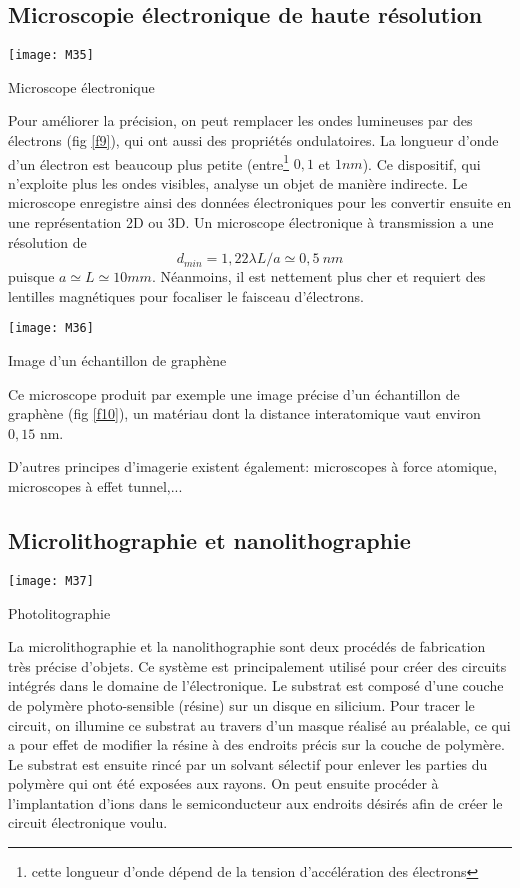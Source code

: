 \subsection{Microscopie électronique de haute résolution}

\begin{marginfigure}[-1cm]
\texttt{[image: M35]}
\caption{Microscope électronique}
\label{f9}
\end{marginfigure}

Pour améliorer la précision, on peut remplacer les ondes lumineuses par des électrons (fig \ref{f9}), qui ont aussi des propriétés ondulatoires. La longueur d'onde d'un électron est beaucoup plus petite (entre\footnote{cette longueur d'onde dépend de la tension d'accélération des électrons} $0,1$ et $1nm$). Ce dispositif, qui n'exploite plus les ondes visibles, analyse un objet de manière indirecte. Le microscope enregistre ainsi des données électroniques pour les convertir ensuite en une représentation 2D ou 3D. Un microscope électronique à transmission a une résolution de $$d_{min}=1,22\lambda L/a\simeq0,5\:nm$$ puisque $a\simeq L\simeq10mm$.
Néanmoins, il est nettement plus cher et requiert des lentilles magnétiques pour focaliser le faisceau d'électrons.

\begin{marginfigure}[0cm]
\texttt{[image: M36]}
\caption{Image d'un échantillon de graphène}
\label{f10}
\end{marginfigure}

\noindent Ce microscope produit par exemple une image précise d'un échantillon de graphène (fig \ref{f10}), un matériau dont la distance interatomique vaut environ $0,15$ nm.

\noindent D'autres principes d'imagerie existent également: microscopes à force atomique, microscopes à effet tunnel,...

\subsection{Microlithographie et nanolithographie}

\begin{marginfigure}[0cm]
\texttt{[image: M37]}
\caption{Photolitographie}
\label{f11}
\end{marginfigure}

La microlithographie et la nanolithographie sont deux procédés de fabrication très précise d'objets. Ce système est principalement utilisé pour créer des circuits intégrés dans le domaine de l'électronique. Le substrat est composé d'une couche de polymère photo-sensible (résine) sur un disque en silicium. Pour tracer le circuit, on illumine ce substrat au travers d'un masque réalisé au préalable, ce qui a pour effet de modifier la résine à des endroits précis sur la couche de polymère. Le substrat est ensuite rincé par un solvant sélectif pour enlever les parties du polymère qui ont été exposées aux rayons. On peut ensuite procéder à l'implantation d'ions dans le semiconducteur aux endroits désirés afin de créer le circuit électronique voulu. 


